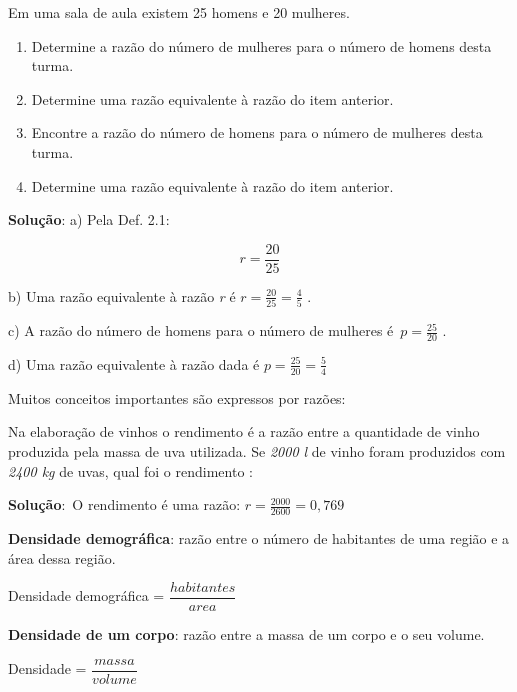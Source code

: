 \begin{texemplo} 
Em uma sala de aula existem 25 homens e 20 mulheres.

\begin{enumerate}[label=\arabic*]
	\item Determine a razão do número de mulheres para o número de homens desta turma.

	\item Determine uma razão equivalente à razão do item anterior.

	\item Encontre a razão do número de homens para o número de mulheres desta turma.

	\item Determine uma razão equivalente à razão do item anterior.\quad 
\end{enumerate}

\textbf{Solução}: a) Pela Def. 2.1: 

$$r=\frac{20}{25} $$

b) Uma razão equivalente à razão \textit{r} é  \( r=\frac{20}{25}=\frac{4}{5} \)  .

c) A razão do número de homens para o número de mulheres é\   \( p=\frac{25}{20} \) .

d) Uma razão equivalente à razão dada é  \( p=\frac{25}{20}=\frac{5}{4} \)  \qedsymbol{}

\end{texemplo}
Muitos conceitos importantes são expressos por razões:

\begin{texemplo} 
	Na elaboração de vinhos o rendimento é a razão entre a quantidade de vinho produzida pela massa de uva utilizada. Se \textit{2000 l} de vinho foram produzidos com \textit{2400 kg} de uvas, qual foi o rendimento :
	
\textbf{Solução}:\ O rendimento é uma razão:   \( r=\frac{2000}{2600}=0,769 \) \qedsymbol{}
\end{texemplo}

\textbf{Densidade demográfica}: razão entre o número de habitantes de uma região e a área dessa região.
\begin{caixa}
	Densidade demográfica = $\dfrac{habitantes}{area}$
\end{caixa}

\textbf{Densidade de um corpo}: razão entre a massa de um corpo e o seu volume.
\begin{caixa}
	Densidade = $\dfrac{massa}{volume}$
\end{caixa}

